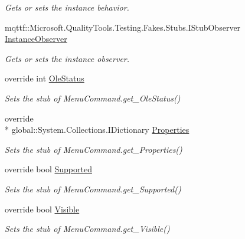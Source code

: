 \begin{DoxyCompactItemize}
\begin{DoxyCompactList}\small\item\em Gets or sets the instance behavior.\end{DoxyCompactList}\item 
mqttf\-::\-Microsoft.\-Quality\-Tools.\-Testing.\-Fakes.\-Stubs.\-I\-Stub\-Observer \hyperlink{class_system_1_1_component_model_1_1_design_1_1_fakes_1_1_stub_menu_command_acc286e46df529075513104c69932afae}{Instance\-Observer}
\begin{DoxyCompactList}\small\item\em Gets or sets the instance observer.\end{DoxyCompactList}\item 
override int \hyperlink{class_system_1_1_component_model_1_1_design_1_1_fakes_1_1_stub_menu_command_a7d6a24887a25fc091cb54c80160637b2}{Ole\-Status}
\begin{DoxyCompactList}\small\item\em Sets the stub of Menu\-Command.\-get\-\_\-\-Ole\-Status()\end{DoxyCompactList}\item 
override \\*
global\-::\-System.\-Collections.\-I\-Dictionary \hyperlink{class_system_1_1_component_model_1_1_design_1_1_fakes_1_1_stub_menu_command_a2c221d1059b336838726dad7e450fe39}{Properties}
\begin{DoxyCompactList}\small\item\em Sets the stub of Menu\-Command.\-get\-\_\-\-Properties()\end{DoxyCompactList}\item 
override bool \hyperlink{class_system_1_1_component_model_1_1_design_1_1_fakes_1_1_stub_menu_command_ab6efb3bd855573d5443d47f6b1eeb366}{Supported}
\begin{DoxyCompactList}\small\item\em Sets the stub of Menu\-Command.\-get\-\_\-\-Supported()\end{DoxyCompactList}\item 
override bool \hyperlink{class_system_1_1_component_model_1_1_design_1_1_fakes_1_1_stub_menu_command_a36a2ed3d62ef5e784163ab8448fe75e2}{Visible}
\begin{DoxyCompactList}\small\item\em Sets the stub of Menu\-Command.\-get\-\_\-\-Visible()\end{DoxyCompactList}\end{DoxyCompactItemize}


